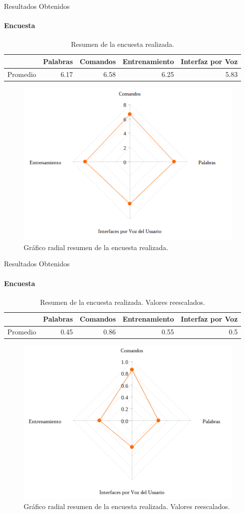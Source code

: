 \begin{frame}{Resultados Obtenidos}
\framesubtitle{Encuesta}
\begin{table}[H] 
\centering
\footnotesize
\begin{tabular}{|r|r|r|r|r|}
\hline
    & Palabras & Comandos & Entrenamiento & Interfaz por Voz \\
    \hline
    Promedio & 6.17 & 6.58 & 6.25 & 5.83 \\
\hline
\end{tabular}
\caption{Resumen de la encuesta realizada.}
\label{sec:tabla-encuesta}
\end{table}
\begin{figure}[ht]
\centering
\includegraphics[width=0.6\linewidth]{./graphics/kiviat0.png}
\caption{Gr\'afico radial resumen de la encuesta realizada.}
\label{figure:kiviat-encuesta1}
\end{figure}
\end{frame}

\begin{frame}{Resultados Obtenidos}
\framesubtitle{Encuesta}
\begin{table}[H] 
\centering
\footnotesize
\begin{tabular}{|r|r|r|r|r|}
\hline
    &  Palabras & Comandos & Entrenamiento & Interfaz por Voz \\
    \hline
    Promedio & 0.45 & 0.86 & 0.55 & 0.5 \\

\hline
\end{tabular}
\caption{Resumen de la encuesta realizada. Valores reescalados.}
\label{sec:tabla-encuesta-normalizada}
\end{table}

\begin{figure}[ht]
\centering
\includegraphics[width=0.6\linewidth]{./graphics/kiviat.png}
\caption{Gr\'afico radial resumen de la encuesta realizada. Valores reescalados.}
\label{figure:kiviat-encuesta2}
\end{figure}

\end{frame}